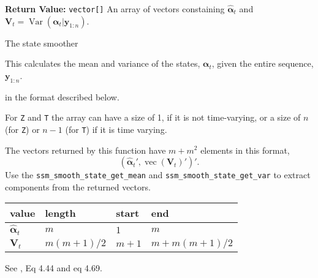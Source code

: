 \documentclass[]{book}
\DeclareMathOperator{\Var}{Var}
\DeclareMathOperator{\VEC}{vec}
\newcommand{\mat}[1]{\boldsymbol{#1}}
\renewcommand{\vec}[1]{\boldsymbol{#1}}
\begin{document}
\textbf{Return Value:} \texttt{vector{[}{]}} An array of vectors
constaining \(\hat{\vec{\alpha}}_t\) and
\(\mat{V}_t = \Var(\vec{\alpha}_t | \vec{y}_{1:n})\).

The state smoother

This calculates the mean and variance of the states, \(\vec{\alpha}_t\),
given the entire sequence, \(\vec{y}_{1:n}\).

in the format described below.

For \texttt{Z} and \texttt{T} the array can have a size of 1, if it is
not time-varying, or a size of \(n\) (for \texttt{Z}) or \(n - 1\) (for
\texttt{T}) if it is time varying.

The vectors returned by this function have \(m + m ^ 2\) elements in
this format, \[
(\hat{\vec{\alpha}}_t', \VEC(\mat{V}_t)' )'.
\] Use the \texttt{ssm\_smooth\_state\_get\_mean} and
\texttt{ssm\_smooth\_state\_get\_var} to extract components from the
returned vectors.

\begin{longtable}[c]{@{}llll@{}}
\toprule
value & length & start & end\tabularnewline
\midrule
\endhead
\(\hat{\vec{\alpha}}_t\) & \(m\) & \(1\) & \(m\)\tabularnewline
\(\mat{V}_t\) & \(m (m + 1) / 2\) & \(m + 1\) &
\(m + m (m + 1) / 2\)\tabularnewline
\bottomrule
\end{longtable}

See \textcite{DurbinKoopman2012}, Eq 4.44 and eq 4.69.
\end{document}

